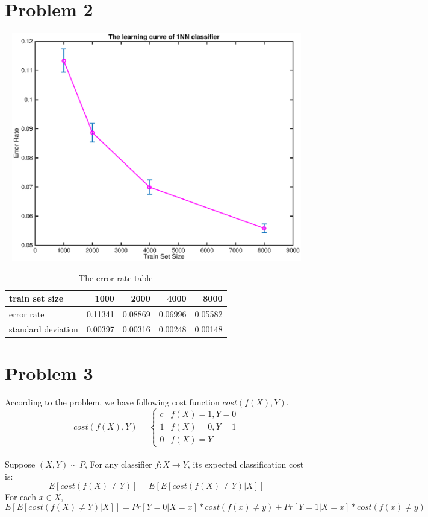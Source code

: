 \documentclass[twoside,11pt]{homework}
\begin{document}
\section*{Problem 2}
\begin{center}
\includegraphics[width=150mm, height = 100mm]{learningcurve.eps}

\begin{table}[h]
\caption {The error rate table} \label{tab:title}
\centering
\begin{tabular}{@{}lrrrr@{}}
\toprule
train set  size                        & 1000    & 2000    & 4000    & 8000    \\ \midrule
error  rate                            & 0.11341 & 0.08869 & 0.06996 & 0.05582 \\ \midrule
standard deviation              & 0.00397 & 0.00316 & 0.00248 & 0.00148
\end{tabular}

\end{table}
\end{center}




\section*{Problem 3}

\indent
According to the problem, we have following cost function $cost(f(X), Y)$.
\[
cost(f(X), Y) =
\begin{cases} 
c & f(X) = 1, Y = 0 \\ 
1 & f(X) = 0, Y = 1 \\
0 & f(X) = Y
\end{cases}
\] \\
Suppose $(X, Y) \sim P$, For any classifier $f: X \rightarrow Y$, its expected classification cost is:
\[
E[cost(f(X) \neq Y)]  = E[E[cost(f(X) \neq Y)|X] ]
\] 
For each $x \in X$,
\[
E[E[cost(f(X) \neq Y)|X]]= Pr[Y=0|X=x]*cost(f(x)\neq y)+ Pr[Y=1|X=x]*cost(f(x)\neq y)
\] 
\end{document}
